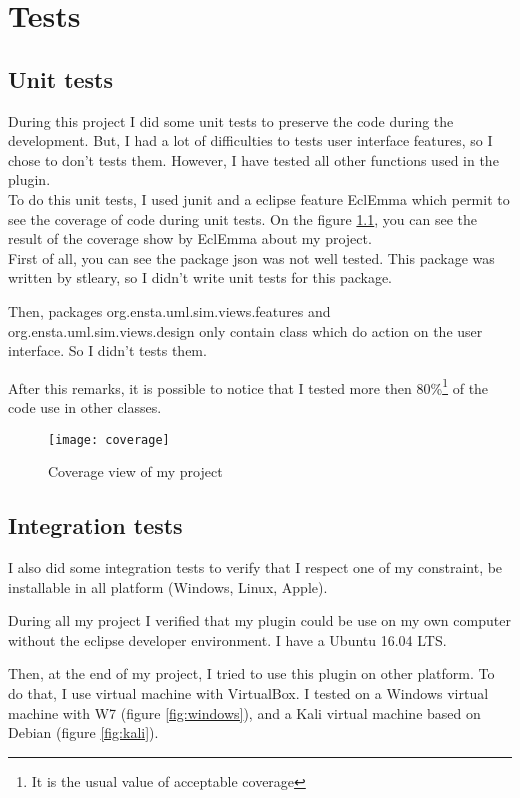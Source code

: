
\chapter{Tests}
\label{chap:test}

\section{Unit tests}

During this project I did some unit tests to preserve the code during the development. But, I had a lot of difficulties to tests user interface features, so I chose to don't tests them. However, I have tested all other functions used in the plugin.
~\\

To do this unit tests, I used junit and a eclipse feature EclEmma which permit to see the coverage of code during unit tests. On the figure \ref{fig:coverage}, you can see the result of the coverage show by EclEmma about my project.
~\\

First of all, you can see the package json was not well tested. This package was written by stleary\cite{json}, so I didn't write unit tests for this package.

Then, packages org.ensta.uml.sim.views.features and org.ensta.uml.sim.views.design only contain class which do action on the user interface. So I didn't tests them.

After this remarks, it is possible to notice that I tested more then 80\%\footnote{It is the usual value of acceptable coverage} of the code use in other classes.


\begin{figure}[h]
  \centering
  \texttt{[image: coverage]}
  \caption{Coverage view of my project}
  \label{fig:coverage}
\end{figure}

\section{Integration tests}

I also did some integration tests to verify that I respect one of my constraint, be installable  in all platform (Windows, Linux, Apple).

During all my project I verified that my plugin could be use on my own computer without the eclipse developer environment. I have a Ubuntu 16.04 LTS.

Then, at the end of my project, I tried to use this plugin on other platform. To do that, I use virtual machine with VirtualBox. I tested on a Windows virtual machine with W7 (figure \ref{fig:windows}), and a Kali virtual machine based on Debian (figure \ref{fig:kali}).

